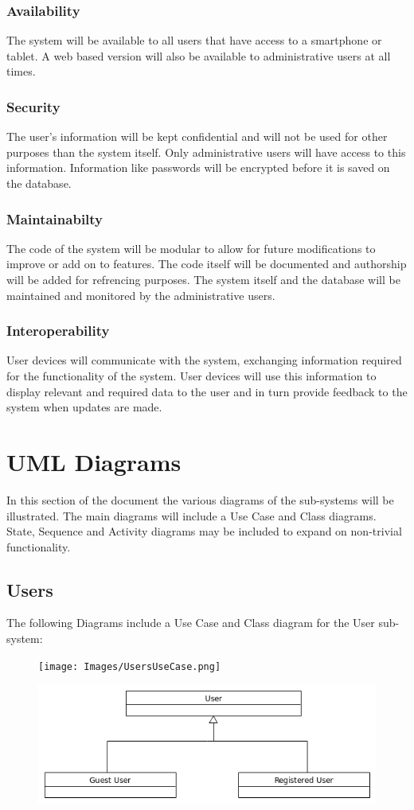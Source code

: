 \documentclass{article}
\begin{document}
		\subsubsection{Availability}
		The system will be available to all users that have access to a smartphone or tablet. A web based version will also be available to administrative users at all times.
		\subsubsection{Security}
		The user's information will be kept confidential and will not be used for other purposes than the system itself. Only administrative users will have access to this information. Information like passwords will be encrypted before it is saved on the database.
		\subsubsection{Maintainabilty}
		The code of the system will be modular to allow for future modifications to improve or add on to features. The code itself will be documented and authorship will be added for refrencing purposes. The system itself and the database will be maintained and monitored by the administrative users.
		\subsubsection{Interoperability}
		User devices will communicate with the system, exchanging information required for the functionality of the system. User devices will use this information to display relevant and required data to the user and in turn provide feedback to the system when updates are made.

\section{UML Diagrams}
In this section of the document the various diagrams of the sub-systems will be illustrated. The main diagrams will include a Use Case and Class diagrams. State, Sequence and Activity diagrams may be included to expand on non-trivial functionality.
	\subsection{Users}
	The following Diagrams include a Use Case and Class diagram for the User sub-system:	
	\begin{figure}[h]
		\centering
  		\texttt{[image: Images/UsersUseCase.png]}
	\end{figure}
	\begin{figure}[h]
	\centering
  		\includegraphics[width=\textwidth]{Images/UserClass.png}
	\end{figure}
	
\end{document}
